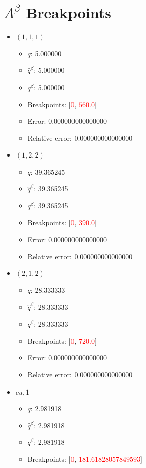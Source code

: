 \documentclass{article}%
\begin{document}
\section{$A^\beta$ Breakpoints}%
\thispagestyle{plain}%
\begin{itemize}%
	\item $(1, 1, 1)$%
	\begin{itemize}%
		\item $q$: 5.000000%
		\item $\hat{q}^\beta$: 5.000000%
		\item $q^\beta$: 5.000000%
		\item Breakpoints: $[$\textcolor{red}{$0$}, \textcolor{red}{$560.0$}$]$%
		\item Error: 0.000000000000000%
		\item Relative error: 0.000000000000000%
	\end{itemize}%
	\item $(1, 2, 2)$%
	\begin{itemize}%
		\item $q$: 39.365245%
		\item $\hat{q}^\beta$: 39.365245%
		\item $q^\beta$: 39.365245%
		\item Breakpoints: $[$\textcolor{red}{$0$}, \textcolor{red}{$390.0$}$]$%
		\item Error: 0.000000000000000%
		\item Relative error: 0.000000000000000%
	\end{itemize}%
	\item $(2, 1, 2)$%
	\begin{itemize}%
		\item $q$: 28.333333%
		\item $\hat{q}^\beta$: 28.333333%
		\item $q^\beta$: 28.333333%
		\item Breakpoints: $[$\textcolor{red}{$0$}, \textcolor{red}{$720.0$}$]$%
		\item Error: 0.000000000000000%
		\item Relative error: 0.000000000000000%
	\end{itemize}%
	\item $\textit{cu},1$%
	\begin{itemize}%
		\item $q$: 2.981918%
		\item $\hat{q}^\beta$: 2.981918%
		\item $q^\beta$: 2.981918%
		\item Breakpoints: $[$\textcolor{red}{$0$}, \textcolor{red}{$181.61828057849593$}$]$%

\end{itemize}
\end{itemize}
\end{document}
